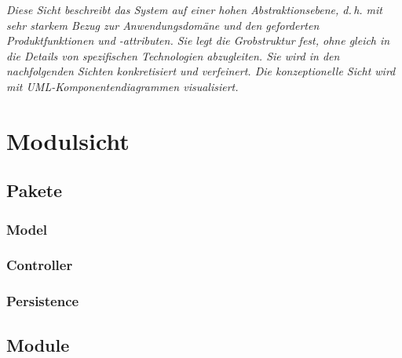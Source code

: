 \documentclass[enabledeprecatedfontcommands,fontsize=12pt,paper=a4,twoside]{scrartcl}
\begin{document}
{\it Diese Sicht beschreibt das System auf einer hohen Abstraktionsebene,
d.\,h. mit sehr starkem Bezug zur Anwendungsdomäne und den geforderten
Produktfunktionen und \linebreak-attributen. Sie legt die Grobstruktur fest,
ohne gleich in die Details von spezifischen Technologien abzugleiten.
Sie wird in den nachfolgenden Sichten konkretisiert und verfeinert. Die
konzeptionelle Sicht wird mit {UML}-Komponentendiagrammen visualisiert.}

\section{Modulsicht}
\label{sec:modulsicht}

\subsection{Pakete}

\subsubsection{Model}

\subsubsection{Controller}

\subsubsection{Persistence}

\subsection{Module}
\end{document}
